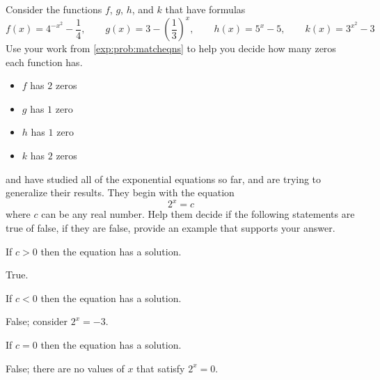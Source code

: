 \begin{exercises}
\begin{problem}[Zeros]
Consider the functions $f$, $g$, $h$, and $k$ that have formulas
\[
	f(x)=4^{-x^2}-\frac{1}{4}, \qquad 
	g(x)=3-\left( \frac{1}{3} \right)^{x}, \qquad
	h(x)=5^x-5, \qquad 
	k(x)=3^{x^2}-3
\]
Use your work from \cref{exp:prob:matcheqns} to help you decide how 
many zeros each function has.
\begin{shortsolution}
	\begin{itemize}
		\item $f$ has $2$ zeros
		\item $g$ has $1$ zero
		\item $h$ has $1$ zero
		\item $k$ has $2$ zeros
	\end{itemize}
\end{shortsolution}
\end{problem}

\begin{problem}
 and  have studied all of the exponential equations so far, and 
are trying to generalize their results. They begin with the equation
\[
	2^x=c
\]
where $c$ can be any real number. Help them decide if the following statements
are true of false, if they are false, provide an example that supports your 
answer.
\begin{subproblem}
	If $c>0$ then the equation has a solution.
	\begin{shortsolution}
		True. 
	\end{shortsolution}
\end{subproblem}
\begin{subproblem}
	If $c<0$ then the equation has a solution. 
	\begin{shortsolution}
		False; consider $2^x=-3$. 
	\end{shortsolution}
\end{subproblem}
\begin{subproblem}
	If $c=0$ then the equation has a solution. 
	\begin{shortsolution}
		False; there are no values of $x$ that satisfy $2^x=0$.
	\end{shortsolution}
\end{subproblem}
\end{problem}



\end{exercises}
